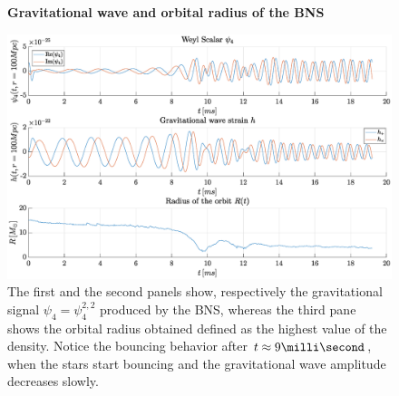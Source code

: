 \begin{figure}[H]
\centering
    \textbf{Gravitational wave and orbital radius of the BNS}\par\medskip
\centering   
\includegraphics[width=1\textwidth]{numerical_evolution/gw_r_bns.eps}
\caption{The first and the second panels show, respectively the gravitational signal $\psi_4=\psi_4 ^{2,2}$ produced by the BNS, whereas the third pane shows the orbital radius obtained defined as the highest value of the density. 
Notice the bouncing behavior after $t \approx 9 \milli \second$, when the stars start bouncing and the gravitational wave amplitude decreases slowly.}
\label{gw_r_bns}
\end{figure}

